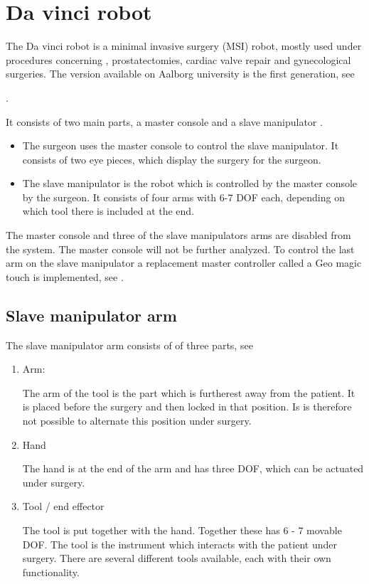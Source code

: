 \section{Da vinci robot}\label{sec:da_vin_rob}

The Da vinci robot is a minimal invasive surgery (MSI) robot, mostly used under procedures concerning , prostatectomies, cardiac valve repair and gynecological surgeries. The version available on Aalborg university is the first generation, see 

. 

It consists of two main parts, a master console and a slave manipulator . 

\begin{itemize}
\item The surgeon uses the master console to control the slave manipulator. It consists of two eye pieces, which display the surgery for the surgeon. 
\item The slave manipulator is the robot which is controlled by the master console by the surgeon. It consists of four arms with 6-7 \gls{DOF} each, depending on which tool there is included at the end.
\end{itemize}

The master console and three of the slave manipulators arms are disabled from the system. The master console will not be further analyzed. To control the last arm on the slave manipulator a replacement master controller called a Geo magic touch is implemented, see .


\subsection*{Slave manipulator arm}
The slave manipulator arm consists of of three parts, see
\begin{enumerate}
\item Arm:

The arm of the tool is the part which is furtherest away from the patient. It is placed before the surgery and then locked in that position. Is is therefore not possible to alternate this position under surgery.
\item Hand

The hand is at the end of the arm and has three \gls{DOF}, which can be actuated under surgery.
\item Tool / end effector 

The tool is put together with the hand. Together these has 6 - 7 movable \gls{DOF}. The tool is the instrument which interacts with the patient under surgery. There are several different tools available, each with their own functionality. 
\end{enumerate}